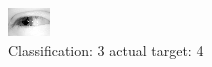 \begin{figure}[h!]
\begin{center}
\includegraphics[width=0.60\columnwidth]{figures/ID2464_class_3_target_4.png}
\end{center}
\caption{ Classification: 3 actual target: 4}
\label{fig:ID2464_class_3_target_4}
\end{figure}
